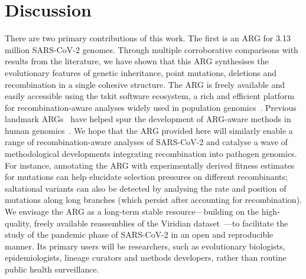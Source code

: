 \documentclass[12pt]{article}
\begin{document}
\section*{Discussion}
There are two primary contributions of this work. The first is an
ARG for 3.13 million SARS-CoV-2 genomes.
Through multiple corroborative comparisons with results from the
literature, we have shown that this ARG synthesises
the evolutionary features of genetic inheritance, point mutations,
deletions and recombination in a single cohesive structure.
The ARG is freely available and easily accessible using the
tskit software ecosystem, a rich and efficient platform for
recombination-aware analyses widely used in population
genomics~\cite{Jeffery2026population}.
Previous landmark ARGs~\cite{Wohns2022,Anderson2023genes}
have helped spur the development of ARG-aware methods in human
genomics~\cite{Mejia2025using,Grundler2025geographic,
Lehmann2025args,Terhorst2025accelerated}.
We hope that the ARG provided here will similarly
enable a range of recombination-aware analyses of SARS-CoV-2 and
catalyse a wave of methodological developments integrating
recombination into pathogen genomics.
For instance, annotating the ARG with experimentally derived
fitness estimates for mutations can help elucidate selection
pressures on different recombinants;
saltational variants can also be detected by analysing the rate and position of mutations along long
branches (which persist after accounting for recombination).
We envisage the ARG as a long-term stable resource---building on the
high-quality, freely available reassemblies of
the Viridian dataset~\cite{Hunt2026}---to facilitate the study
of the pandemic phase of SARS-CoV-2 in an open and reproducible manner.
Its primary users will be researchers, such as evolutionary biologists,
epidemiologists, lineage curators and methods developers,
rather than routine public health surveillance.
\end{document}
